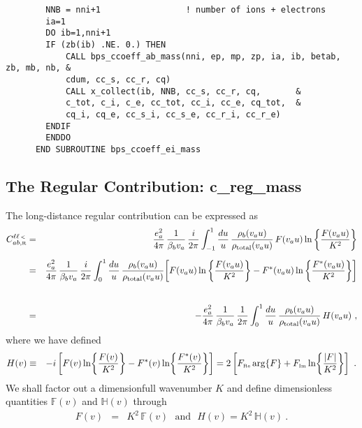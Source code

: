 \documentclass[preprint,12pt,eqsecnum,nofootinbib,amsmath,amssymb]{revtex4}
\newcommand{\smR}{{\rm\scriptscriptstyle R}}
\newcommand{\smRe}{{\rm\scriptscriptstyle Re}}
\newcommand{\smIm}{{\rm\scriptscriptstyle Im}}
\newcommand{\smLT}{{\rm\scriptscriptstyle <}}
\begin{document}
{{\begin{verbatim}
        NNB = nni+1                 ! number of ions + electrons
        ia=1
        DO ib=1,nni+1
        IF (zb(ib) .NE. 0.) THEN
            CALL bps_ccoeff_ab_mass(nni, ep, mp, zp, ia, ib, betab, zb, mb, nb, &
            cdum, cc_s, cc_r, cq)
            CALL x_collect(ib, NNB, cc_s, cc_r, cq,       &
            c_tot, c_i, c_e, cc_tot, cc_i, cc_e, cq_tot,  &
            cq_i, cq_e, cc_s_i, cc_s_e, cc_r_i, cc_r_e)
        ENDIF
        ENDDO
      END SUBROUTINE bps_ccoeff_ei_mass
\end{verbatim}


\subsection{The Regular Contribution: c\_reg\_mass}


The long-distance regular contribution can be expressed as
\begin{eqnarray}
  C^{\ell\ell \, \smLT}_{ab,\smR} 
  &=&
  \frac{e_a^2}{4\pi} \, \frac{1}{\beta_b v_a} \, 
  \frac{i}{2\pi} \int_{-1}^1 \frac{du}{u}\,
  \frac{\rho_b(v_a u)}{\rho_\text{total}(v_a u)}\,
  F(v_a u) \ln \left\{ \frac{F(v_a u)}{K^2} \right\}
\\[5pt]
  &=&
  \frac{e_a^2}{4\pi}\,\frac{1}{\beta_b v_a} \, 
  \frac{i}{2\pi} \int_0^1 \frac{du}{u}\,
  \frac{\rho_b(v_a u)}{\rho_\text{total}(v_a u)}\!
  \left[
  F(v_a u) \ln \left\{ \frac{F(v_a u)}{K^2} \right\}
  -
  F^*(v_a u) \ln \left\{ \frac{F^*(v_a u)}{K^2} \right\}
  \right]
  \nonumber\\
\\[5pt]
  &=&
  -\frac{e_a^2}{4\pi}\,\frac{1}{\beta_b v_a} \, 
  \frac{1}{2\pi} \int_0^1 \frac{du}{u}\,
  \frac{\rho_b(v_a u)}{\rho_\text{total}(v_a u)}\, H(v_a u) \ ,
\end{eqnarray}
where we have defined
\begin{eqnarray}
  H(v) 
  &\equiv&
  -i\left[
  F(v) \ln\!\left\{ \frac{F(v)}{K^2}\right\} -
  F^*(v)\ln\!\left\{\frac{F^*(v)}{K^2} \right\}\right]
  =
  2\left[
  F_\smRe\, {\rm arg}\{F\}
  +
  F_{\smIm} \ln\!\left\{\frac{\vert F \vert}{K^2}\right\}
   \right] \ .
\nonumber\\
\label{Hbagain}
\end{eqnarray}
We shall factor out a dimensionfull wavenumber $K$ and define
dimensionless quantities $\mathbb{F}(v)$ and $\mathbb{H}(v)$
through
\begin{eqnarray}
  F(v) &=& K^2\,  \mathbb{F}(v) 
  ~~~\text{and}~~~
  H(v) = K^2\,  \mathbb{H}(v) \ .
\end{eqnarray}
}}
\end{document}
